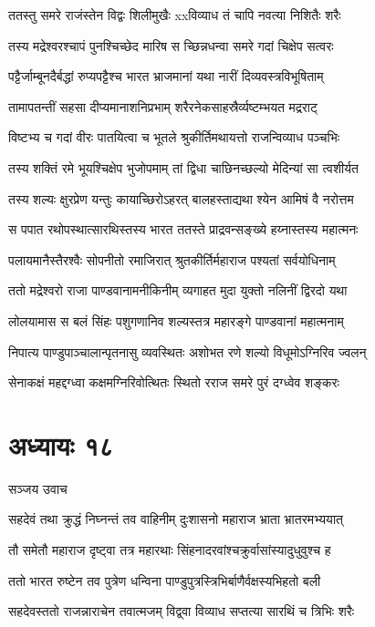 \twolineshloka
{ततस्तु समरे राजंस्तेन विद्वः शिलीमुखैः}
{xxविव्याध तं चापि नवत्या निशितैः शरैः}


\twolineshloka
{तस्य मद्रेश्वरश्चापं पुनश्चिच्छेद मारिष}
{स च्छिन्नधन्वा समरे गदां चिक्षेप सत्वरः}


\twolineshloka
{पट्टैर्जाम्बूनदैर्बद्धां रुप्यपट्टैश्च भारत}
{भ्राजमानां यथा नारीं दिव्यवस्त्रविभूषिताम्}


\twolineshloka
{तामापतन्तीं सहसा दीप्यमानाशनिप्रभाम्}
{शरैरनेकसाहस्रैर्व्यष्टम्भयत मद्रराट्}


\twolineshloka
{विष्टभ्य च गदां वीरः पातयित्वा च भूतले}
{श्रुकीर्तिमथायत्तो राजन्विव्याध पञ्चभिः}


\twolineshloka
{तस्य शक्तिं रमे भूयश्चिक्षेप भुजोपमाम्}
{तां द्विधा चाछिनच्छल्यो मेदिन्यां सा त्वशीर्यत}


\twolineshloka
{तस्य शल्यः क्षुरप्रेण यन्तुः कायाच्छिरोऽहरत्}
{बालहस्ताद्यथा श्येन आमिषं वै नरोत्तम}


\twolineshloka
{स पपात रथोपस्थात्सारथिस्तस्य भारत}
{ततस्ते प्राद्रवन्सङ्ख्ये हय्नास्तस्य महात्मनः}


\twolineshloka
{पलायमानैस्तैरश्वैः सोपनीतो रमाजिरात्}
{श्रुतकीर्तिर्महाराज पश्यतां सर्वयोधिनाम्}


\twolineshloka
{ततो मद्रेश्वरो राजा पाण्डवानामनीकिनीम्}
{व्यगाहत मुदा युक्तो नलिनीं द्विरदो यथा}


\twolineshloka
{लोलयामास स बलं सिंहः पशुगणानिव}
{शल्यस्तत्र महारङ्गे पाण्डवानां महात्मनाम्}


\twolineshloka
{निपात्य पाण्डुपाञ्चालान्पृतनासु व्यवस्थितः}
{अशोभत रणे शल्यो विधूमोऽग्निरिव ज्वलन्}


\twolineshloka
{सेनाकक्षं महद्दग्ध्वा कक्षमग्निरिवोत्थितः}
{स्थितो रराज समरे पुरं दग्ध्वेव शङ्करः}


\chapter{अध्यायः १८}
\twolineshloka
{सञ्जय उवाच}
{}


\twolineshloka
{सहदेवं तथा क्रुद्धं निघ्नन्तं तव वाहिनीम्}
{दुःशासनो महाराज भ्राता भ्रातरमभ्ययात्}


\twolineshloka
{तौ समेतौ महाराज दृष्ट्वा तत्र महारथाः}
{सिंहनादरवांश्चक्रुर्वासांस्यादुधुवुश्च ह}


\twolineshloka
{ततो भारत रुष्टेन तव पुत्रेण धन्विना}
{पाण्डुपुत्रस्त्रिभिर्बाणैर्वक्षस्यभिहतो बली}


\twolineshloka
{सहदेवस्ततो राजन्नाराचेन तवात्मजम्}
{विद्व्वा विव्याध सप्तत्या सारथिं च त्रिभिः शरैः}


